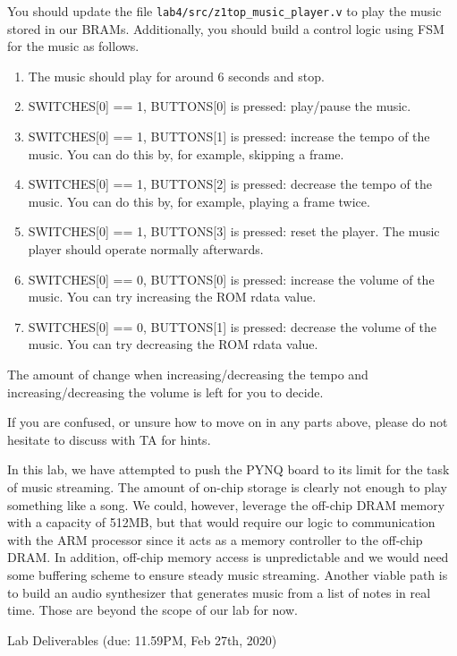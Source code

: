 \documentclass[11pt]{article}
\makeatletter
\renewcommand{\section}
{\@startsection {section}{1}{0pt}
 {-2ex}
 {1ex}
 {\bfseries\Large}}
\makeatother
\begin{document}
You should update the file \verb|lab4/src/z1top_music_player.v| to play the music stored in our BRAMs. Additionally, you should build a control logic using FSM for the music as follows.
\begin{enumerate}
  \item The music should play for around 6 seconds and stop.
  \item SWITCHES[0] == 1, BUTTONS[0] is pressed: play/pause the music.
  \item SWITCHES[0] == 1, BUTTONS[1] is pressed: increase the tempo of the music. You can do this by, for example, skipping a frame.
  \item SWITCHES[0] == 1, BUTTONS[2] is pressed: decrease the tempo of the music. You can do this by, for example, playing a frame twice.
  \item SWITCHES[0] == 1, BUTTONS[3] is pressed: reset the player. The music player should operate normally afterwards.
  \item SWITCHES[0] == 0, BUTTONS[0] is pressed: increase the volume of the music. You can try increasing the ROM rdata value.
  \item SWITCHES[0] == 0, BUTTONS[1] is pressed: decrease the volume of the music. You can try decreasing the ROM rdata value.
\end{enumerate}

The amount of change when increasing/decreasing the tempo and increasing/decreasing the volume is left for you to decide.

If you are confused, or unsure how to move on in any parts above, please do not hesitate to discuss with TA for hints.

In this lab, we have attempted to push the PYNQ board to its limit for the task of music streaming. The amount of on-chip storage is clearly not enough to play something like a song. We could, however, leverage the off-chip DRAM memory with a capacity of 512MB, but that would require our logic to communication with the ARM processor since it acts as a memory controller to the off-chip DRAM. In addition, off-chip memory access is unpredictable and we would need some buffering scheme to ensure steady music streaming. Another viable path is to build an audio synthesizer that generates music from a list of notes in real time. Those are beyond the scope of our lab for now.

\newpage
\section{Lab Deliverables (due: 11.59PM, Feb 27th, 2020)}
\end{document}
